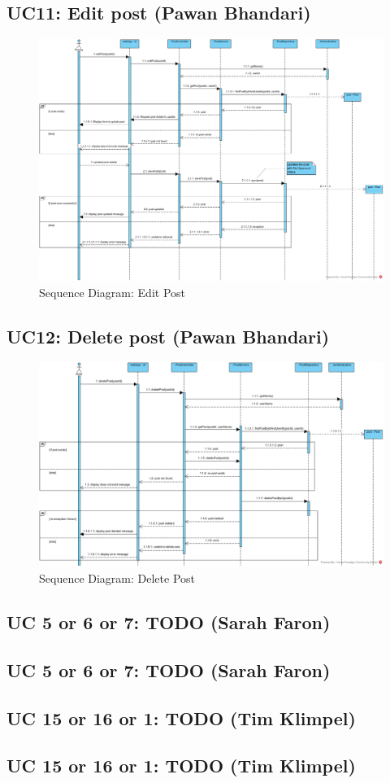 \documentclass{article}
\begin{document}
\subsection{UC11: Edit post (Pawan Bhandari)}
\begin{figure}[H]
    \centering
    \includegraphics[width=.98\textwidth]{images/SD-UC11-EditPost.png}
    \centering
    \caption{Sequence Diagram: Edit Post}
\end{figure}
\subsection{UC12: Delete post (Pawan Bhandari)}
\begin{figure}[H]
    \centering
    \includegraphics[width=.98\textwidth]{images/SD-UC12-DeletePost.png}
    \centering
    \caption{Sequence Diagram: Delete Post}
\end{figure}
\subsection{UC 5 or 6 or 7: TODO (Sarah Faron)}
\subsection{UC 5 or 6 or 7: TODO (Sarah Faron)}
\subsection{UC 15 or 16 or 1: TODO (Tim Klimpel)}
\subsection{UC 15 or 16 or 1: TODO (Tim Klimpel)}
\end{document}
